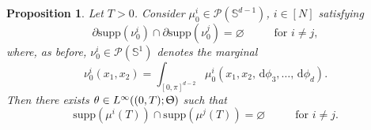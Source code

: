 \documentclass[a4paper,11pt]{article}
\theoremstyle{plain}
\newtheorem{proposition}[theorem]{Proposition}
\newcommand{\supp}{\mathrm{supp}}
\newcommand{\diff}{\, \mathrm{d}}
\renewcommand{\S}{\mathbb{S}^{d-1}}
\numberwithin{equation}{section}
\begin{document}
\begin{proposition} \label{lem: feedback}
    Let $T>0$. Consider $\mu_0^i\in\mathscr{P}(\S)$, $i\in[N]$ satisfying
    \begin{equation*}
        \partial\supp(\nu_0^i)\cap \partial\supp(\nu_0^j)=\varnothing\hspace{1cm} \text{ for } i\neq j,
    \end{equation*}
    where, as before, $\nu_0^i\in\mathscr{P}(\mathbb{S}^1)$ denotes the marginal
    $$\nu_0^i(x_1,x_2) = \int_{[0,\pi]^{d-2}} \mu_0^i(x_1,x_2,\diff\phi_3,\ldots,\diff\phi_d).$$
    Then there exists $\theta\in L^\infty((0,T);\Uptheta)$ such that
        \begin{equation*}
        \supp\left(\mu^i(T)\right)\cap \supp\left(\mu^j(T)\right)=\varnothing\hspace{1cm} \text{ for } i\neq j.
    \end{equation*}
\end{proposition}
\end{document}
